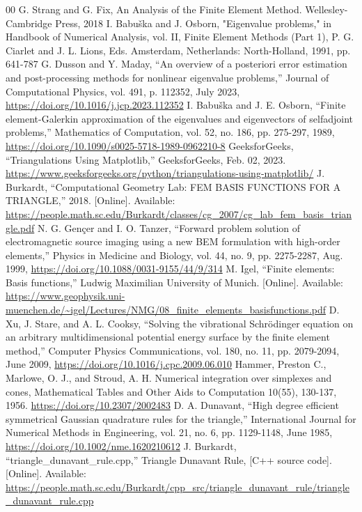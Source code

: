 \documentclass[conference]{IEEEtran}
\begin{document}
\begin{thebibliography}{00}
 G. Strang and G. Fix, An Analysis of the Finite Element Method. Wellesley-Cambridge Press, 2018
 I. Babuška and J. Osborn, "Eigenvalue problems," in Handbook of Numerical Analysis, vol. II, Finite Element Methods (Part 1), P. G. Ciarlet and J. L. Lions, Eds. Amsterdam, Netherlands: North-Holland, 1991, pp. 641-787
 G. Dusson and Y. Maday, “An overview of a posteriori error estimation and post-processing methods for nonlinear eigenvalue problems,” Journal of Computational Physics, vol. 491, p. 112352, July 2023, \url{https://doi.org/10.1016/j.jcp.2023.112352}
 I. Babuška and J. E. Osborn, “Finite element-Galerkin approximation of the eigenvalues and eigenvectors of selfadjoint problems,” Mathematics of Computation, vol. 52, no. 186, pp. 275-297, 1989, \url{https://doi.org/10.1090/s0025-5718-1989-0962210-8}
 GeeksforGeeks, “Triangulations Using Matplotlib,” GeeksforGeeks, Feb. 02, 2023. \url{https://www.geeksforgeeks.org/python/triangulations-using-matplotlib/}
 J. Burkardt, “Computational Geometry Lab: FEM BASIS FUNCTIONS FOR A TRIANGLE,” 2018. [Online]. Available: \url{https://people.math.sc.edu/Burkardt/classes/cg_2007/cg_lab_fem_basis_triangle.pdf}
 N. G. Gençer and I. O. Tanzer, “Forward problem solution of electromagnetic source imaging using a new BEM formulation with high-order elements,” Physics in Medicine and Biology, vol. 44, no. 9, pp. 2275-2287, Aug. 1999, \url{https://doi.org/10.1088/0031-9155/44/9/314}
 M. Igel, “Finite elements: Basis functions,” Ludwig Maximilian University of Munich. [Online]. Available: \url{https://www.geophysik.uni-muenchen.de/~igel/Lectures/NMG/08_finite_elements_basisfunctions.pdf}
 D. Xu, J. Stare, and A. L. Cooksy, “Solving the vibrational Schrödinger equation on an arbitrary multidimensional potential energy surface by the finite element method,” Computer Physics Communications, vol. 180, no. 11, pp. 2079-2094, June 2009, \url{https://doi.org/10.1016/j.cpc.2009.06.010}
 Hammer, Preston C., Marlowe, O. J., and Stroud, A. H. Numerical integration over simplexes and cones, Mathematical Tables and Other Aids to Computation 10(55), 130-137, 1956. \url{https://doi.org/10.2307/2002483}
 D. A. Dunavant, “High degree efficient symmetrical Gaussian quadrature rules for the triangle,” International Journal for Numerical Methods in Engineering, vol. 21, no. 6, pp. 1129-1148, June 1985, \url{https://doi.org/10.1002/nme.1620210612}
 J. Burkardt, “triangle\_dunavant\_rule.cpp,” Triangle Dunavant Rule, [C++ source code]. [Online]. Available: \url{https://people.math.sc.edu/Burkardt/cpp_src/triangle_dunavant_rule/triangle_dunavant_rule.cpp}

\end{thebibliography}
\end{document}
